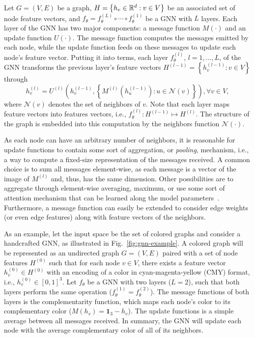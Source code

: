 Let $G=(V,E)$ be a graph, $H =\left\{ h_v\in \mathbb{R}^{d}: v\in V \right\} $ be an associated set of node feature vectors, and $f_\theta = f_\theta^{(L)} \circ \cdots \circ f_\theta^{(1)}$ be a GNN with $L$ layers.
Each layer of the GNN has two major components: a message function $M(\cdot)$ and an update function $U(\cdot)$.
The message function computes the messages emitted by each node, while the update function feeds on these messages to update each node's feature vector.
Putting it into terms, each layer $f^{(l)}_\theta$, $l=1,\ldots,L$, of the GNN transforms the previous layer's feature vectors $H^{(l-1)}=\left\{ h^{(l-1)}_v : v \in V \right\}$ through 
\[
     h^{(l)}_v = U^{(l)}\left( h^{(l-1)}_v , \left\{ M^{(l)}(h^{(l-1)}_u):u\in \mathcal{N}(v) \right\}  \right) , \forall v \in V
,\] where $\mathcal{N}(v)$ denotes the set of neighbors of $v$.
Note that each layer maps feature vectors into features vectors, i.e., $f_\theta^{(l)}: H^{(l-1)} \mapsto H^{(l)}$.
The structure of the graph is embedded into this computation by the neighbors function $\mathcal{N}(\cdot)$.

As each node can have an arbitrary number of neighbors, it is reasonable for update functions to contain some sort of aggregation, or \emph{pooling}, mechanism, i.e., a way to compute a fixed-size representation of the messages received.
A common choice is to sum all messages element-wise, as each message is a vector of the image of $M^{(l)}$ and, thus, has the same dimension.
Other possibilities are to aggregate through element-wise averaging, maximum, or use some sort of attention mechanism that can be learned along the model parameters~\cite{veličković2018graph}.
Furthermore, a message function can easily be extended to consider edge weights (or even edge features) along with feature vectors of the neighbors.

As an example, let the input space be the set of colored graphs and consider a handcrafted GNN, as illustrated in Fig.~\ref{fig:gnn-example}.
A colored graph will be represented as an undirected graph $G=(V,E)$ paired with a set of node features $H^{(0)}$ such that for each node $v\in V$, there exists a feature vector $h_v^{(0)}\in H^{(0)}$ with an encoding of a color in cyan-magenta-yellow (CMY) format, i.e., $h_v^{(0)}\in [0,1]^3$.
Let $f_\theta$ be a GNN with two layers ($L=2$), such that both layers perform the same operation ($f_\theta^{(1)}=f_\theta^{(2)}$).
The message functions of both layers is the complementarity function, which maps each node's color to its complementary color ($M(h_v) = \bm{1}_3 - h_v$).  
The update functions is a simple average between all messages received.
In summary, the GNN will update each node with the average complementary color of all of its neighbors.

